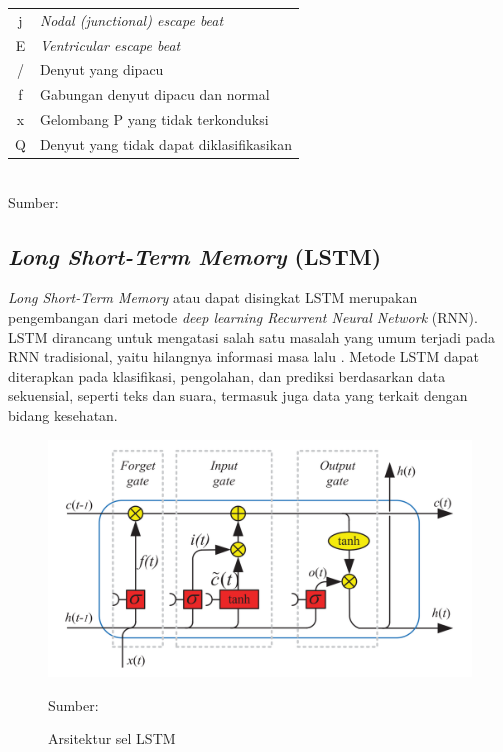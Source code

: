 \begin{table}[H]
\begin{tabular}{|c|l|}
    j & \textit{Nodal (junctional) escape beat} \\
    E & \textit{Ventricular escape beat} \\
    / & Denyut yang dipacu \\
    f & Gabungan denyut dipacu dan normal \\
    x & Gelombang P yang tidak terkonduksi \\
    Q & Denyut yang tidak dapat diklasifikasikan \\
    \hline
    \end{tabular} \\
    \vspace{0.5em}
    Sumber: \textcite{moodyImpactMITBIHArrhythmia2001}
    \label{tab:beat_symbols}
\end{table}

\subsection{\textit{Long Short-Term Memory} (LSTM)}
\label{subsec: landasan-lstm}

\textit{Long Short-Term Memory} atau dapat disingkat LSTM merupakan pengembangan dari metode \textit{deep learning Recurrent Neural Network} (RNN). LSTM dirancang untuk mengatasi salah satu masalah yang umum terjadi pada RNN tradisional, yaitu hilangnya informasi masa lalu \parencite{hochreiterLongShorttermMemory1997}. Metode LSTM dapat diterapkan pada klasifikasi, pengolahan, dan prediksi berdasarkan data sekuensial, seperti teks dan suara,  termasuk juga data yang terkait dengan bidang kesehatan.

\begin{figure}[H]
  \centering
  \includegraphics[width=.7\linewidth]{img/ecg-arch.png}
  \caption{Arsitektur sel LSTM}
  Sumber: \textcite{yuReviewRecurrentNeural2019}
  \label{fig:arsitektur-lstm}
\end{figure}

